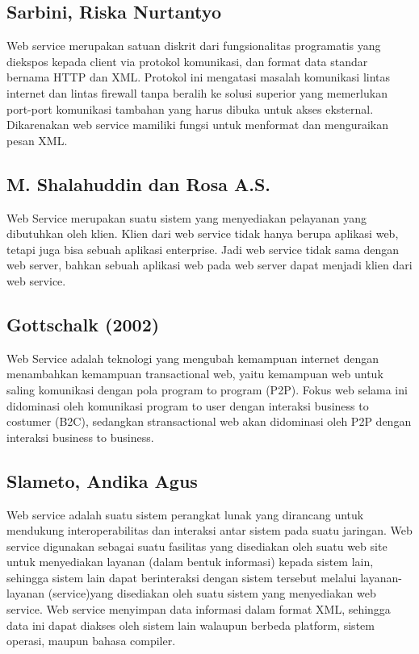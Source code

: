 \documentclass[12pt]{article}
\begin{document}
\subsection{Sarbini, Riska Nurtantyo}

Web service merupakan satuan diskrit dari fungsionalitas programatis yang diekspos 
kepada client via protokol komunikasi, dan format data standar bernama HTTP dan 
XML. Protokol ini mengatasi masalah komunikasi lintas internet dan lintas 
firewall tanpa beralih ke solusi superior yang memerlukan port-port komunikasi 
tambahan yang harus dibuka untuk akses eksternal. Dikarenakan web service mamiliki fungsi untuk menformat dan menguraikan pesan XML\cite{sarbini2015pengembangan}. 

\subsection{M. Shalahuddin dan Rosa A.S.}

Web Service merupakan suatu sistem yang menyediakan pelayanan yang dibutuhkan oleh klien. Klien dari web service tidak hanya berupa aplikasi web, tetapi juga bisa sebuah aplikasi enterprise. Jadi web service tidak sama dengan web server, bahkan sebuah aplikasi web pada web server dapat menjadi klien dari web service\cite{inayah2014aplikasi}.

\subsection{Gottschalk (2002)}

Web Service adalah teknologi yang mengubah kemampuan internet dengan menambahkan kemampuan transactional web, yaitu kemampuan web untuk saling komunikasi dengan pola program to program (P2P). Fokus web selama ini didominasi oleh komunikasi program to user dengan interaksi business to costumer (B2C), sedangkan stransactional web akan didominasi oleh P2P dengan interaksi business to business\cite{fauziah2014aplikasi}.


\subsection{Slameto, Andika Agus}

Web service adalah suatu sistem perangkat lunak yang dirancang untuk mendukung interoperabilitas dan interaksi antar sistem pada suatu jaringan. Web service digunakan sebagai suatu fasilitas yang disediakan oleh suatu web site untuk menyediakan layanan (dalam bentuk informasi) kepada sistem lain, sehingga sistem lain dapat berinteraksi dengan sistem tersebut melalui layanan-layanan (service)yang disediakan oleh suatu sistem yang menyediakan web service. Web service menyimpan data informasi dalam format XML, sehingga data ini dapat diakses oleh sistem lain walaupun berbeda platform, sistem operasi, maupun bahasa compiler\cite{slameto2015penerapan}.
\end{document}
